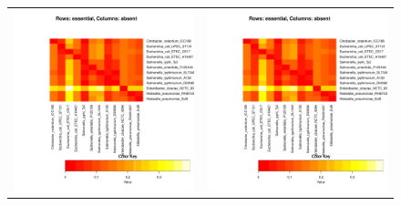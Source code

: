 \documentclass[a4paper,10pt, twocolumn]{article}
\begin{document}
\begin{figure}
\begin{tabular}{c c}
\includegraphics[page=3, scale=0.35]{essentiality-heatmap.pdf} & 
\includegraphics[page=4, scale=0.35]{essentiality-heatmap.pdf} \\

\end{tabular}
\end{figure}
\end{document}
